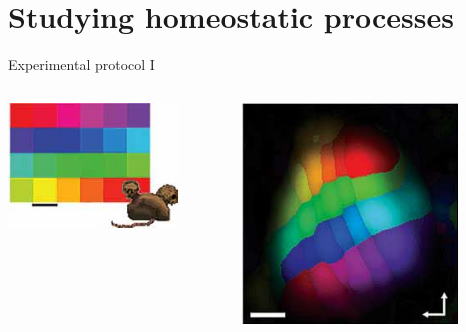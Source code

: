 \section{Studying homeostatic processes}
\begin{frame}[c]{Experimental protocol I}
  \begin{columns}
    \begin{column}{0.5\textwidth}
      \centering
      \includegraphics[width=0.8\textwidth]{99_images/keck-1-1a}%
    \end{column}
    \begin{column}{0.5\textwidth}
      \centering
      \includegraphics[width=0.8\textwidth]{99_images/keck-1-1c}%
    \end{column}
  \end{columns}
\end{frame}

